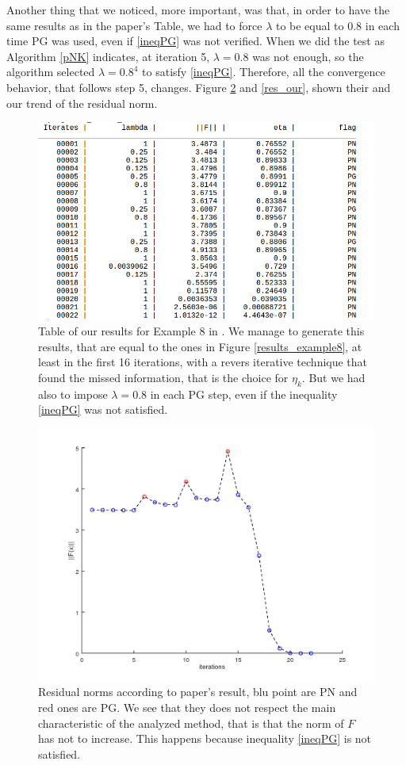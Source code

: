 Another thing that we noticed, more important, was that, in order to have the same results as in the paper's Table, we had to force $ \lambda $ to be equal to $ 0.8 $ in each time PG was used, even if \eqref{ineqPG} was not verified. When we did the test as Algorithm \ref{pNK} indicates, at iteration 5, $ \lambda = 0.8 $ was not enough, so the algorithm selected $ \lambda = 0.8^4 $ to satisfy \eqref{ineqPG}. Therefore, all the convergence behavior, that follows step 5, changes. Figure \ref{res_paper} and \ref{res_our}, shown their and our trend of the residual norm.\\
\begin{figure}[h]
	\centering
	\includegraphics[width=1\linewidth]{ourresults8}
	\caption[Table of our results for example 8 in \cite{MAIN}]{Table of our results for Example 8 in \cite{MAIN}. We manage to generate this results, that are equal to the ones in Figure \ref{results_example8}, at least in the first 16 iterations, with a revers iterative technique that found the missed information, that is the choice for $ \eta_k $. But we had also to impose $ \lambda = 0.8 $ in each PG step, even if the inequality \eqref{ineqPG} was not satisfied.}
	\label{our_example8}
\end{figure}
\begin{figure}[h]
	\centering
	\includegraphics[width=0.8\linewidth]{res_paper}
	\caption[Plot of residuals found in \cite{MAIN}]{Residual norms according to paper's result, blu point are PN and red ones are PG. We see that they does not respect the main characteristic of the analyzed method, that is that the norm of $ F $ has not to increase. This happens because inequality \eqref{ineqPG} is not satisfied.}
	\label{res_paper}
\end{figure}
